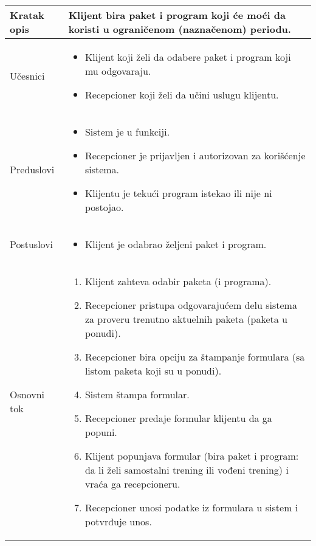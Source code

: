 \documentclass[../main.tex]{subfiles}
\begin{document}
\begin{longtable}{| p{} | p{} |} 

\hline
    Kratak opis & Klijent bira paket i program koji će moći da koristi u ograničenom (naznačenom) periodu. \\ 
\hline    
    Učesnici & 
    	\begin{itemize}
        \item Klijent koji želi da odabere paket i program koji mu odgovaraju.
        \item Recepcioner koji želi da učini uslugu klijentu.
     \end{itemize}\\
\hline
   Preduslovi & \begin{itemize}
       \item Sistem je u funkciji.
       \item Recepcioner je prijavljen i autorizovan za korišćenje sistema.
       \item Klijentu je tekući program istekao ili nije ni postojao.
   \end{itemize}\\
\hline  
    Postuslovi & \begin{itemize}
        \item Klijent je odabrao željeni paket i program.
    \end{itemize}\\
\hline
    Osnovni tok & \begin{enumerate}
        \item Klijent zahteva odabir paketa (i programa).
        \item Recepcioner pristupa odgovarajućem delu sistema za proveru trenutno aktuelnih paketa (paketa u ponudi).
        \item Recepcioner bira opciju za štampanje formulara (sa listom paketa koji su u ponudi).
        \item Sistem štampa formular.
        \item Recepcioner predaje formular klijentu da ga popuni.
        \item Klijent popunjava formular (bira paket i program: da li želi samostalni trening ili vođeni trening) i vraća ga recepcioneru.
        \item Recepcioner unosi podatke iz formulara u sistem i potvrđuje unos.

\end{enumerate}
\end{longtable}
\end{document}
